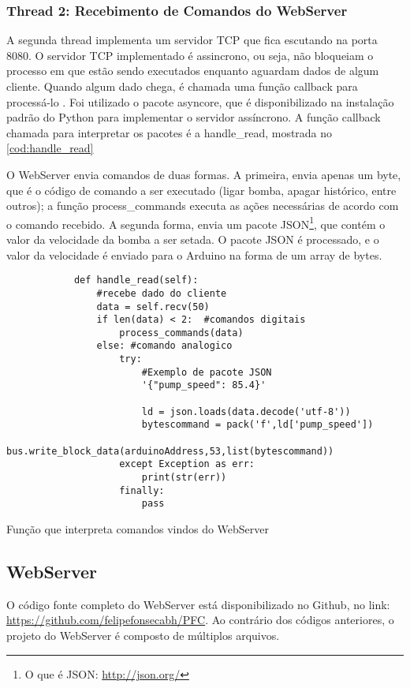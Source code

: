 		\subsubsection{Thread 2: Recebimento de Comandos do WebServer}
		A segunda thread implementa um servidor TCP que fica escutando na porta 8080. O servidor TCP implementado é assincrono, ou seja, não bloqueiam o processo em que estão sendo executados enquanto aguardam dados de algum cliente. Quando algum dado chega, é chamada uma função callback para processá-lo \cite{pythondoc}. Foi utilizado o pacote asyncore, que é disponibilizado na instalação padrão do Python para implementar o servidor assíncrono. A função callback chamada para interpretar os pacotes é a handle\_read, mostrada no \autoref{cod:handle_read}
		
		O WebServer envia comandos de duas formas. A primeira, envia apenas um byte, que é o código de comando a ser executado (ligar bomba, apagar histórico, entre outros); a função process\_commands executa as ações necessárias de acordo com o comando recebido. A segunda forma, envia um pacote JSON\footnote{O que é JSON: \url{http://json.org/}}, que contém o valor da velocidade da bomba a ser setada. O pacote JSON é processado, e o valor da velocidade é enviado para o Arduino na forma de um array de bytes.
		
		\begin{listing}[!htb]
			\begin{verbatim}
			def handle_read(self):
				#recebe dado do cliente
				data = self.recv(50)
				if len(data) < 2:  #comandos digitais
					process_commands(data)
				else: #comando analogico
					try:
						#Exemplo de pacote JSON
						'{"pump_speed": 85.4}'
			
						ld = json.loads(data.decode('utf-8'))
						bytescommand = pack('f',ld['pump_speed'])
						bus.write_block_data(arduinoAddress,53,list(bytescommand))
					except Exception as err:
						print(str(err))
					finally:
						pass
			\end{verbatim}
			\caption{Função que interpreta comandos vindos do WebServer}
			\label{cod:handle_read}
		\end{listing}
	
	\subsection{WebServer}
	O código fonte completo do WebServer está disponibilizado no Github, no link: \url{https://github.com/felipefonsecabh/PFC}. Ao contrário dos códigos anteriores, o projeto do WebServer é composto de múltiplos arquivos.
	
